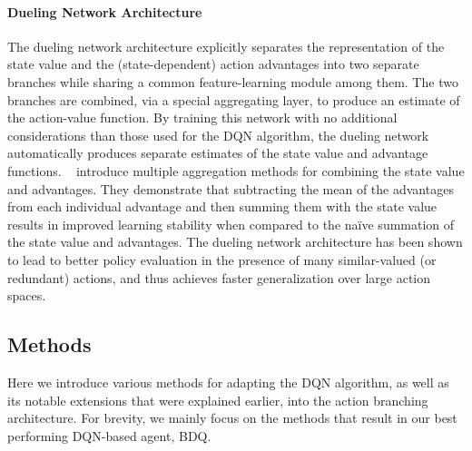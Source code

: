 \documentclass[letterpaper]{article} %
\newcommand{\citet}[1]
{\citeauthor{#1}~\shortcite{#1}}
\newcommand{\citep}{\cite}
\begin{document}
\paragraph{Dueling Network Architecture} The dueling network architecture \citep{Wang:2016} explicitly separates the representation of the state value and the (state-dependent) action advantages into two separate branches while sharing a common feature-learning module among them. The two branches are combined, via a special aggregating layer, to produce an estimate of the action-value function. By training this network with no additional considerations than those used for the DQN algorithm, the dueling network automatically produces separate estimates of the state value and advantage functions. \citet{Wang:2016} introduce multiple aggregation methods for combining the state value and advantages. They demonstrate that subtracting the mean of the advantages from each individual advantage and then summing them with the state value results in improved learning stability when compared to the na{\"i}ve summation of the state value and advantages. The dueling network architecture has been shown to lead to better policy evaluation in the presence of many similar-valued (or redundant) actions, and thus achieves faster generalization over large action spaces.


\subsection{Methods}
\label{subsec:bdq_methods}

Here we introduce various methods for adapting the DQN algorithm, as well as its notable extensions that were explained earlier, into the action branching architecture. For brevity, we mainly focus on the methods that result in our best performing DQN-based agent, BDQ.
\end{document}
